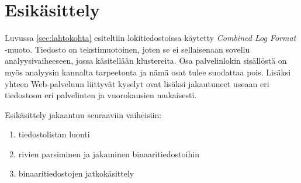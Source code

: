 \section{Esikäsittely}

Luvussa \ref{sec:lahtokohta} esiteltiin lokitiedostoissa käytetty
\textit{Combined Log Format} -muoto. Tiedosto on tekstimuotoinen,
joten se ei sellaisenaan sovellu analyysivaiheeseen, jossa käsitellään
klustereita. Osa palvelinlokin sisällöstä on myös analyysin kannalta
tarpeetonta ja nämä osat tulee suodattaa pois. Lisäksi yhteen
Web-palveluun liittyvät kyselyt ovat lisäksi jakautuneet useaan eri
tiedostoon eri palvelinten ja vuorokausien mukaisesti.

Esikäsittely jakaantuu seuraaviin vaiheisiin:

\begin{enumerate}
\item tiedostolistan luonti
\item rivien parsiminen ja jakaminen binaaritiedostoihin
\item binaaritiedostojen jatkokäsittely
\end{enumerate}

